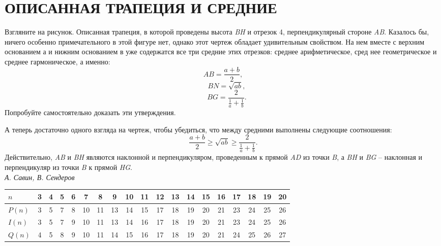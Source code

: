 \begin{minipage}{0.3\textwidth} %
    \titleformat{\section}{\filcenter\Large\bfseries}{}{}{}
    \section*{ОПИСАННАЯ ТРАПЕЦИЯ И СРЕДНИЕ}
    Взгляните на рисунок. Описанная трапеция, в которой проведены высота \textit{BH} и отрезок 4, перпендикулярный стороне \textit{AB}. Казалось бы, ничего особенно примечательного в этой фигуре нет, однако этот чертеж обладает удивительным свойством. На нем вместе с верхним основанием а и нижним основанием в уже содержатся все три средние этих отрезков: среднее арифметическое, сред нее геометрическое и среднее гармоническое, а именно:\[AB = \frac{a+b}{2},\] \[\quad BN = \sqrt{ab},\] \[\quad BG = \frac{2}{\frac{1}{a}+\frac{1}{b}}.\]
    Попробуйте самостоятельно доказать эти утверждения.
     \begin{figure}[H]
        \centering
        
    \end{figure}
    А теперь достаточно одного взгляда на чертеж, чтобы убедиться, что между средними выполнены следующие соотношения:
    \[ \frac{a+b}{2} \geq \sqrt{ab} \geq \frac{2}{\frac{1}{a}+\frac{1}{b}}.\]
    Действительно, \textit{AB} и \textit{BH} являются наклонной и перпендикуляром, проведенным к прямой \textit{AD} из точки \textit{B}, а \textit{BH} и \textit{BG} -- наклонная и перпендикуляр из точки \textit{B} к прямой \textit{HG}.\\
    
    {\textit{А. Савин, В. Сендеров}}\raggedleft
\end{minipage}
\begin{center}
    \begin{tabular}{|l|c|c|c|c|c|c|c|c|c|c|c|c|c|c|c|c|c|c|}
        \hline
        $n$ & 3 & 4 & 5 & 6 & 7 & 8 & 9 & 10 & 11 & 12 & 13 & 14 & 15 & 16 & 17 & 18 & 19 & 20  \\ 
        \hline
        $P(n)$ & 3  & 5 & 7 & 8 & 10 & 11 & 13 & 14 & 15 & 17 & 18 & 19 & 20 & 21 & 23 & 24 & 25 & 26 \\ 
        \hline
        $I(n)$ & 3  & 5 & 7 & 9 & 10 & 11 & 13 & 14 & 16 & 17 & 18 & 19 & 20 & 21 & 23 & 24 & 25 & 26 \\ 
        \hline
        $Q(n)$ & 4  & 5 & 8 & 9 & 10 & 11 & 14 & 15 & 16 & 17 & 18 & 19 & 20 & 21 & 24 & 25 & 26 & 27 \\ 
        \hline
    \end{tabular}
\end{center}
